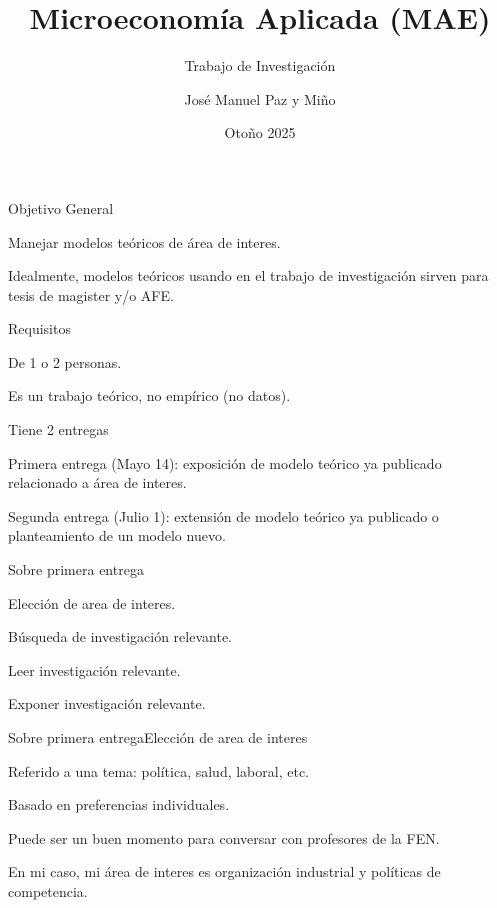\documentclass[notes, 11pt]{beamer} %
\newenvironment{wideitemize}{\itemize\addtolength{\itemsep}{10pt}}{\enditemize}
\begin{document}
\title{Microeconom\'ia Aplicada (MAE)}   
\subtitle{Trabajo de Investigaci\'on}   
\author[Paz y Mino ]{Jos\'e Manuel Paz y Mi\~no}
\date{Oto\~no 2025} 

\frame{\titlepage} 

\begin{frame}{Objetivo General}
	\begin{wideitemize}
		\item<1-> Manejar modelos te\'oricos de \'area de interes.
		\item<2-> Idealmente, modelos te\'oricos usando en el trabajo de investigaci\'on sirven para tesis de magister y/o AFE.
	\end{wideitemize}
\end{frame}

\begin{frame}{Requisitos}
	\begin{wideitemize}
		\item<1-> De 1 o 2 personas.
		\item<2-> Es un trabajo te\'orico, no emp\'irico (no datos).
		\item<3-> Tiene 2 entregas
		\begin{wideitemize}
			\item<4->[--] Primera entrega (Mayo 14): exposici\'on de modelo te\'orico ya publicado relacionado a \'area de interes.
			\item<5->[--] Segunda entrega (Julio 1): extensi\'on de modelo te\'orico ya publicado o planteamiento de un modelo nuevo.
		\end{wideitemize}
	\end{wideitemize}
\end{frame}

\begin{frame}{Sobre primera entrega}
	\begin{wideitemize}
		\item<1-> Elecci\'on de area de interes.
		\item<2-> B\'usqueda de investigaci\'on relevante.
		\item<3-> Leer investigaci\'on relevante.
		\item<4-> Exponer investigaci\'on relevante.
	\end{wideitemize}
\end{frame}

\begin{frame}{Sobre primera entrega}{Elecci\'on de area de interes}
	\begin{wideitemize}
		\item<1-> Referido a una tema: pol\'itica, salud, laboral, etc.
		\item<2-> Basado en preferencias individuales.
		\item<3-> Puede ser un buen momento para conversar con profesores de la FEN.
		\item<4-> En mi caso, mi \'area de interes es organizaci\'on industrial y pol\'iticas de competencia.
	\end{wideitemize}
\end{frame}
\end{document}
